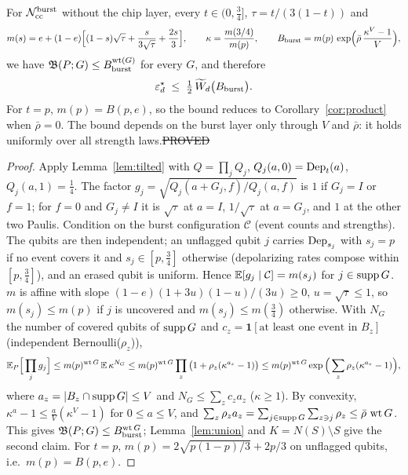 \begin{theorem}\label{thm:burst-product}
For $\mathcal{N}_{\rm cc}^{\rm burst}$ without the chip layer, every $t\in(0,\tfrac34]$, $\tau=t/(3(1-t))$ and
\[
m(s)=e+(1-e)\Big[(1-s)\sqrt\tau+\frac{s}{3\sqrt\tau}+\frac{2s}3\Big],\qquad \kappa=\frac{m(3/4)}{m(p)},\qquad
B_{\rm burst}=m(p)\,\exp\!\Big(\bar\rho\,\frac{\kappa^V-1}V\Big),
\]
we have $\mathfrak{B}(P;G)\le B_{\rm burst}^{\operatorname{wt}(G)}$ for every $G$, and therefore
\[
\varepsilon^{\star}_d\;\le\;\tfrac12\,\widetilde W_d\big(B_{\rm burst}\big).
\]
For $t=p$, $m(p)=B(p,e)$, so the bound reduces to Corollary~\ref{cor:product} when $\bar\rho=0$. The bound depends on the burst layer only through $V$ and $\bar\rho$: it holds uniformly over all strength laws.\hfill\st{PROVED}
\end{theorem}
\begin{proof}
Apply Lemma~\ref{lem:tilted} with $Q=\prod_jQ_j$, $Q_j(a,0)=\mathrm{Dep}_t(a)$, $Q_j(a,1)=\tfrac14$. The factor $g_j=\sqrt{Q_j(a+G_j,f)/Q_j(a,f)}$ is $1$ if $G_j=I$ or $f=1$; for $f=0$ and $G_j\ne I$ it is $\sqrt\tau$ at $a=I$, $1/\sqrt\tau$ at $a=G_j$, and $1$ at the other two Paulis.
Condition on the burst configuration $\mathcal C$ (event counts and strengths). The qubits are then independent; an unflagged qubit $j$ carries $\mathrm{Dep}_{s_j}$ with $s_j=p$ if no event covers it and $s_j\in[p,\tfrac34]$ otherwise (depolarizing rates compose within $[p,\tfrac34]$), and an erased qubit is uniform. Hence $\mathbb{E}[g_j\mid\mathcal C]=m(s_j)$ for $j\in\operatorname{supp} G$.
$m$ is affine with slope $(1-e)(1+3u)(1-u)/(3u)\ge0$, $u=\sqrt\tau\le1$, so $m(s_j)\le m(p)$ if $j$ is uncovered and $m(s_j)\le m(\tfrac34)$ otherwise. With $N_G$ the number of covered qubits of $\operatorname{supp} G$ and $c_z=\mathbf 1[\text{at least one event in }B_z]$ (independent Bernoulli($\rho_z$)),
\[
\mathbb{E}_P\Big[\prod_jg_j\Big]\le m(p)^{\operatorname{wt} G}\,\mathbb{E}\,\kappa^{N_G}\le m(p)^{\operatorname{wt} G}\prod_z\big(1+\rho_z(\kappa^{a_z}-1)\big)\le m(p)^{\operatorname{wt} G}\exp\Big(\sum_z\rho_z(\kappa^{a_z}-1)\Big),
\]
where $a_z=|B_z\cap\operatorname{supp} G|\le V$ and $N_G\le\sum_zc_za_z$ ($\kappa\ge1$). By convexity, $\kappa^{a}-1\le\tfrac aV(\kappa^V-1)$ for $0\le a\le V$, and $\sum_z\rho_za_z=\sum_{j\in\operatorname{supp} G}\sum_{z\ni j}\rho_z\le\bar\rho\,\operatorname{wt} G$.
This gives $\mathfrak{B}(P;G)\le B_{\rm burst}^{\operatorname{wt} G}$; Lemma~\ref{lem:union} and $K=N(S)\setminus S$ give the second claim. For $t=p$, $m(p)=2\sqrt{p(1-p)/3}+2p/3$ on unflagged qubits, i.e.\ $m(p)=B(p,e)$.
\end{proof}

